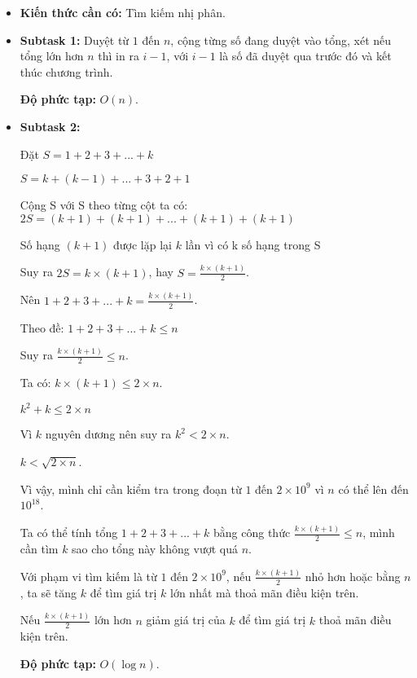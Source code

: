 \documentclass[12pt]{scrartcl}  %
\begin{document}
\begin{itemize}
    \item \textbf{Kiến thức cần có:} Tìm kiếm nhị phân.
    \item \textbf{Subtask 1:} Duyệt từ $1$ đến $n$, cộng từng số đang duyệt vào tổng, xét nếu tổng
    lớn hơn $n$ thì in ra $i - 1$, với $i - 1$ là số đã duyệt qua trước đó và kết thúc chương trình.

    \textbf{Độ phức tạp:} $O(n)$.
    \item \textbf{Subtask 2:}
    

    Đặt $S = 1 + 2 + 3 + ... + k$

    $S = k + (k - 1) + ... + 3 + 2 + 1$
    
    Cộng S với S theo từng cột ta có: $2S = (k + 1) + (k + 1) + ... + (k + 1) + (k + 1)$

    Số hạng $(k + 1)$ được lặp lại $k$ lần vì có k số hạng trong S

    Suy ra $2S = k \times (k + 1)$, hay $S = \frac{k \times (k + 1)}{2}$.

    Nên $1 + 2 + 3 + ... + k = \frac{k \times (k + 1)}{2}$.

    Theo đề: $1 + 2 + 3 + ... + k \leq n$

    Suy ra $\frac{k \times (k + 1)}{2} \leq n$.

    Ta có: $k \times (k + 1) \leq 2 \times n$.

    $k^2 + k \leq 2 \times n$

    Vì $k$ nguyên dương nên suy ra $k^2 < 2 \times n$.
    
    $k < \sqrt{2 \times n}$.

    Vì vậy, mình chỉ cần kiểm tra trong đoạn từ $1$ đến $2 \times 10^9$ vì $n$ có thể lên đến $10^{18}$.

    Ta có thể tính tổng $1 + 2 + 3 + ... + k$ bằng công thức $\frac{k \times (k + 1)}{2} \leq n$,
    mình cần tìm $k$ sao cho tổng này không vượt quá $n$.

    Với phạm vi tìm kiếm là từ $1$ đến $2 \times 10^{9}$, nếu $\frac{k \times (k + 1)}{2}$ nhỏ hơn hoặc bằng
    $n$, ta sẽ tăng $k$ để tìm giá trị $k$ lớn nhất mà thoả mãn điều kiện trên.
        
    Nếu $\frac{k \times (k + 1)}{2}$ lớn hơn $n$
    giảm giá trị của $k$ để tìm giá trị $k$ thoả mãn điều kiện trên.

    \textbf{Độ phức tạp:} $O(\log n)$.

\end{itemize}
\end{document}
